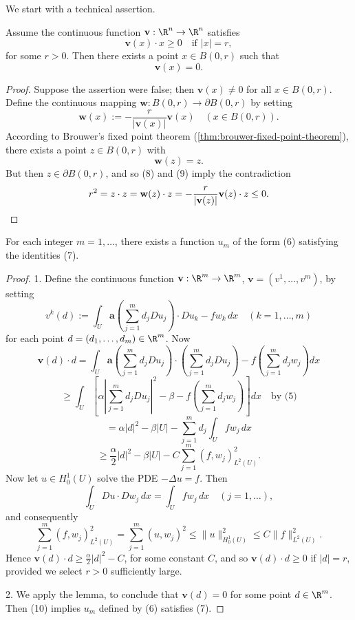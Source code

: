 We start with a technical assertion.

\begin{lemma}
\label{lem:zeros-of-a-vector-field}
Assume the continuous function $\mathbf{v} : \R^n \to \R^n$ satisfies
\[
\mathbf{v}(x) \cdot x \geq 0 \quad \text{if } |x| = r,
\tag{8}
\]
for some $r > 0$. Then there exists a point $x \in B(0,r)$ such that
\[
\mathbf{v}(x) = 0.
\]
\end{lemma}
\begin{proof}
Suppose the assertion were false; then $\mathbf{v}(x) \neq 0$ for all $x \in B(0,r)$. Define the continuous mapping $\mathbf{w} : B(0,r) \to \partial B(0,r)$ by setting
\[
\mathbf{w}(x) := -\frac{r}{|\mathbf{v}(x)|}\mathbf{v}(x) \quad (x \in B(0,r)).
\]
According to Brouwer's fixed point theorem (\cref{thm:brouwer-fixed-point-theorem}), there exists a point $z \in B(0,r)$ with
\[
\mathbf{w}(z) = z.
\tag{9}
\]
But then $z \in \partial B(0,r)$, and so (8) and (9) imply the contradiction
\[
r^2 = z \cdot z = \mathbf{w}(z) \cdot z = -\frac{r}{|\mathbf{v}(z)|}\mathbf{v}(z) \cdot z \leq 0. \qedhere
\]
\end{proof}

\begin{theorem}
\label{thm:monotonicity-approximate-solutions}
For each integer $m = 1, \ldots$, there exists a function $u_m$ of the form (6) satisfying the identities (7).
\end{theorem}
\begin{proof}
1. Define the continuous function $\mathbf{v} : \R^m \to \R^m$, $\mathbf{v} = (v^1, \ldots, v^m)$, by setting
\[
v^k(d) := \int_U \mathbf{a}\left(\sum_{j=1}^m d_j Du_j\right) \cdot Du_k - fw_k \, dx \quad (k = 1, \ldots, m)
\tag{10}
\]
for each point $d = (d_1, \ldots, d_m) \in \R^m$. Now
\[
\mathbf{v}(d) \cdot d = \int_U \mathbf{a}\left(\sum_{j=1}^m d_j Du_j\right) \cdot \left(\sum_{j=1}^m d_j Du_j\right) - f\left(\sum_{j=1}^m d_j w_j\right) dx
\]
\[
\geq \int_U \left[\alpha\left|\sum_{j=1}^m d_j Du_j\right|^2 - \beta - f\left(\sum_{j=1}^m d_j w_j\right)\right] dx \quad \text{by (5)}
\]
\[
= \alpha|d|^2 - \beta|U| - \sum_{j=1}^m d_j \int_U f w_j \, dx
\]
\[
\geq \frac{\alpha}{2}|d|^2 - \beta|U| - C\sum_{j=1}^m (f, w_j)^2_{L^2(U)}.
\]
Now let $u \in H^1_0(U)$ solve the PDE $-\Delta u = f$. Then
\[
\int_U Du \cdot Dw_j \, dx = \int_U f w_j \, dx \quad (j = 1, \ldots),
\]
and consequently
\[
\sum_{j=1}^m (f, w_j)^2_{L^2(U)} = \sum_{j=1}^m (u, w_j)^2 \leq \|u\|^2_{H^1_0(U)} \leq C\|f\|^2_{L^2(U)}.
\]
Hence $\mathbf{v}(d) \cdot d \geq \frac{\alpha}{2}|d|^2 - C$, for some constant $C$, and so $\mathbf{v}(d) \cdot d \geq 0$ if $|d| = r$, provided we select $r > 0$ sufficiently large.

2. We apply the lemma, to conclude that $\mathbf{v}(d) = 0$ for some point $d \in \R^m$. Then (10) implies $u_m$ defined by (6) satisfies (7).
\end{proof}

